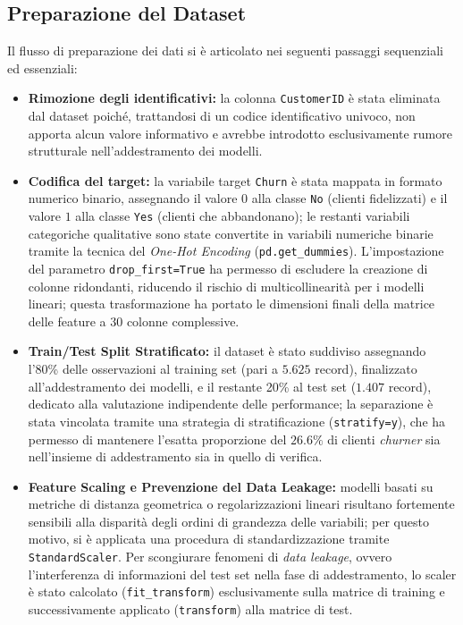 \documentclass[11pt,a4paper]{article}
\begin{document}
\subsection{Preparazione del Dataset}
Il flusso di preparazione dei dati si è articolato nei seguenti passaggi sequenziali ed essenziali:
\begin{itemize}
    \item \textbf{Rimozione degli identificativi:} la colonna \texttt{CustomerID} è stata eliminata dal dataset poiché, trattandosi di un codice identificativo univoco, non apporta alcun valore informativo e avrebbe introdotto esclusivamente rumore strutturale nell'addestramento dei modelli.
    \item \textbf{Codifica del target:} la variabile target \texttt{Churn} è stata mappata in formato numerico binario, assegnando il valore $0$ alla classe \texttt{No} (clienti fidelizzati) e il valore $1$ alla classe \texttt{Yes} (clienti che abbandonano); le restanti variabili categoriche qualitative sono state convertite in variabili numeriche binarie tramite la tecnica del \textit{One-Hot Encoding} (\texttt{pd.get\_dummies}). L'impostazione del parametro \texttt{drop\_first=True} ha permesso di escludere la creazione di colonne ridondanti, riducendo il rischio di multicollinearità per i modelli lineari; questa trasformazione ha portato le dimensioni finali della matrice delle feature a $30$ colonne complessive.
    \item \textbf{Train/Test Split Stratificato:} il dataset è stato suddiviso assegnando l'80\% delle osservazioni al training set (pari a $5.625$ record), finalizzato all'addestramento dei modelli, e il restante 20\% al test set ($1.407$ record), dedicato alla valutazione indipendente delle performance; la separazione è stata vincolata tramite una strategia di stratificazione (\texttt{stratify=y}), che ha permesso di mantenere l'esatta proporzione del $26.6\%$ di clienti \textit{churner} sia nell'insieme di addestramento sia in quello di verifica.
    \item \textbf{Feature Scaling e Prevenzione del Data Leakage:} modelli basati su metriche di distanza geometrica o regolarizzazioni lineari risultano fortemente sensibili alla disparità degli ordini di grandezza delle variabili; per questo motivo, si è applicata una procedura di standardizzazione tramite \texttt{StandardScaler}. Per scongiurare fenomeni di \textit{data leakage}, ovvero l'interferenza di informazioni del test set nella fase di addestramento, lo scaler è stato calcolato (\texttt{fit\_transform}) esclusivamente sulla matrice di training e successivamente applicato (\texttt{transform}) alla matrice di test.
\end{itemize}
\end{document}

